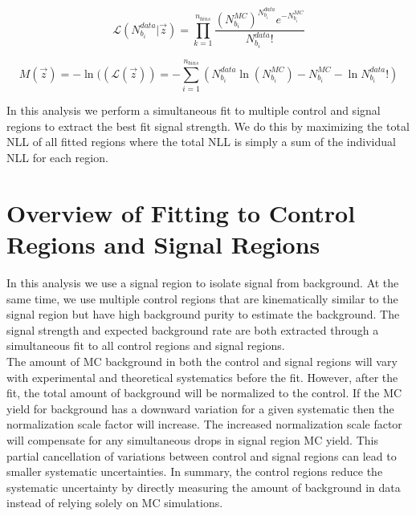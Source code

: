 \begin{equation}
\label{eqn:binnedlikelihood2}
{\mathcal{L}}(N^{data}_{b_i}|\vec{z}) = {\displaystyle\prod_{k=1}^{n_{bins}} \frac{(N^{MC}_{b_i})^{N^{data}_{b_i}}e^{-N^{MC}_{b_i}}}{N^{data}_{b_i}!}}
\end{equation}

\begin{equation}
\label{eqn:binnedNLL2}
M(\vec{z})=-\ln(({\mathcal{L}}(\vec{z})) = -{\displaystyle\sum_{i=1}^{n_{bins}}} ( N^{data}_{b_i} \ln( N^{MC}_{b_i} ) - N^{MC}_{b_i} - \ln{N^{data}_{b_i}!} )
\end{equation}

\indent In this analysis we perform a simultaneous fit to multiple control and signal regions to extract the best fit signal strength.  We do this by maximizing the total NLL of all fitted regions where the total NLL is simply a sum of the individual NLL for each region.  \\

\section{Overview of Fitting to Control Regions and Signal Regions}
\label{sec:stat:Bkg}

\indent In this analysis we use a signal region to isolate signal from background.  At the same time, we use multiple control regions that are kinematically similar to the signal region but have high background purity to estimate the background.  The signal strength and expected background rate are both extracted through a simultaneous fit to all control regions and signal regions.  \\


\indent The amount of MC background in both the control and signal regions will vary with experimental and theoretical systematics before the fit.  However, after the fit, the total amount of background will be normalized to the control.  If the MC yield for background has a downward variation for a given systematic then the normalization scale factor will increase.  The increased normalization scale factor will compensate for any simultaneous drops in signal region MC yield.  This partial cancellation of variations between control and signal regions can lead to smaller systematic uncertainties.  In summary, the control regions reduce the systematic uncertainty by directly measuring the amount of background in data instead of relying solely on MC simulations.  \\

